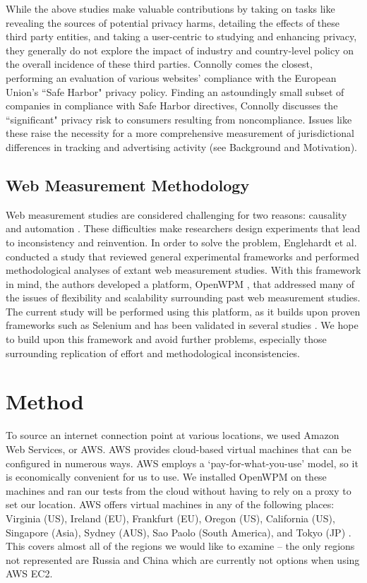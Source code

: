 \documentclass[journal]{IEEEtran}
\begin{document}
While the above studies make valuable contributions by taking on tasks like revealing the sources of potential privacy harms, detailing the effects of these third party entities, and taking a user-centric to studying and enhancing privacy, they generally do not explore the impact of industry and country-level policy on the overall incidence of these third parties. Connolly \cite{connolly} comes the closest, performing an evaluation of various websites' compliance with the European Union's ``Safe Harbor" privacy policy. Finding an astoundingly small subset of companies in compliance with Safe Harbor directives, Connolly discusses the ``significant" privacy risk to consumers resulting from noncompliance.  Issues like these raise the necessity for a more comprehensive measurement of jurisdictional differences in tracking and advertising activity (see Background and Motivation).

\subsection{Web Measurement Methodology}
Web measurement studies are considered challenging for two reasons: causality and automation \cite{openwpm_article}. These difficulties make researchers design experiments that lead to inconsistency and reinvention. In order to solve the problem, Englehardt et al. conducted a study that reviewed general experimental frameworks and performed methodological analyses of extant web measurement studies. With this framework in mind, the authors developed a platform, OpenWPM \cite{openwpm}, that addressed many of the issues of flexibility and scalability surrounding past web measurement studies. The current study will be performed using this platform, as it builds upon proven frameworks such as Selenium \cite{Selenium} and has been validated in several studies \cite{openwpm}\cite{openwpm_article}. We hope to build upon this framework and avoid further problems, especially those surrounding replication of effort and methodological inconsistencies.

\section{Method}

To source an internet connection point at various locations, we used Amazon Web Services, or AWS. AWS provides cloud-based virtual machines that can be configured in numerous ways. AWS employs a `pay-for-what-you-use' model, so it is economically convenient for us to use. We installed OpenWPM on these machines and ran our tests from the cloud without having to rely on a proxy to set our location. AWS offers virtual machines in any of the following places: Virginia (US), Ireland (EU), Frankfurt (EU), Oregon (US), California (US), Singapore (Asia), Sydney (AUS), Sao Paolo (South America), and Tokyo (JP) \cite{amazonregion}. This covers almost all of the regions we would like to examine -- the only regions not represented are Russia and China which are currently not options when using AWS EC2.
\end{document}
